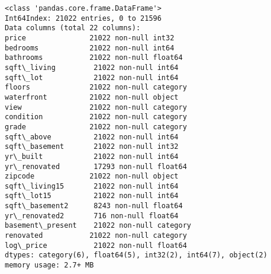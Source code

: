 \documentclass[11pt]{article}
\begin{document}
    \begin{Verbatim}[commandchars=\\\{\}]
<class 'pandas.core.frame.DataFrame'>
Int64Index: 21022 entries, 0 to 21596
Data columns (total 22 columns):
price               21022 non-null int32
bedrooms            21022 non-null int64
bathrooms           21022 non-null float64
sqft\_living         21022 non-null int64
sqft\_lot            21022 non-null int64
floors              21022 non-null category
waterfront          21022 non-null object
view                21022 non-null category
condition           21022 non-null category
grade               21022 non-null category
sqft\_above          21022 non-null int64
sqft\_basement       21022 non-null int32
yr\_built            21022 non-null int64
yr\_renovated        17293 non-null float64
zipcode             21022 non-null object
sqft\_living15       21022 non-null int64
sqft\_lot15          21022 non-null int64
sqft\_basement2      8243 non-null float64
yr\_renovated2       716 non-null float64
basement\_present    21022 non-null category
renovated           21022 non-null category
log\_price           21022 non-null float64
dtypes: category(6), float64(5), int32(2), int64(7), object(2)
memory usage: 2.7+ MB

    \end{Verbatim}
\end{document}
